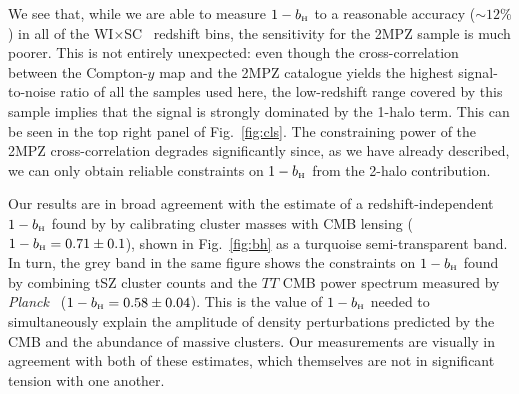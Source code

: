 \documentclass[useAMS,usenatbib]{mn2e}
\newcommand{\wisc}{WI$\times$SC}
\def\bH{b_{\scriptscriptstyle\rm H}}
\def\planck{{\it Planck\/}}
\begin{document}
      
      
      We see that, while we are able to measure $1-\bH$ to a reasonable accuracy ($\sim12\%$) in all of the \wisc~ redshift bins, the sensitivity for the 2MPZ sample is much poorer. This is not entirely unexpected: even though the cross-correlation between the Compton-$y$ map and the 2MPZ catalogue yields the highest signal-to-noise ratio of all the samples used here, the low-redshift range covered by this sample implies that the signal is strongly dominated by the 1-halo term. This can be seen in the top right panel of Fig.\!~\ref{fig:cls}. The constraining power of the 2MPZ cross-correlation degrades significantly since, as we have already described, we can only obtain reliable constraints on $1-\bH$ from the 2-halo contribution.
            
      Our results are in broad agreement with the estimate of a redshift-independent $1-\bH$ found by \cite{2019MNRAS.489..401Z} by calibrating cluster masses with CMB lensing ($1-\bH=0.71\pm0.1$), shown in Fig.\!~\ref{fig:bh} as a turquoise semi-transparent band. In turn, the grey band in the same figure shows the constraints on $1-\bH$ found by combining tSZ cluster counts and the $TT$ CMB power spectrum measured by \planck\ \citep{2016A&A...594A..24P} ($1-\bH=0.58\pm0.04$). This is the value of $1-\bH$ needed to simultaneously explain the amplitude of density perturbations predicted by the CMB and the abundance of massive clusters. Our measurements are visually in agreement with both of these estimates, which themselves are not in significant tension with one another.
      
\end{document}
